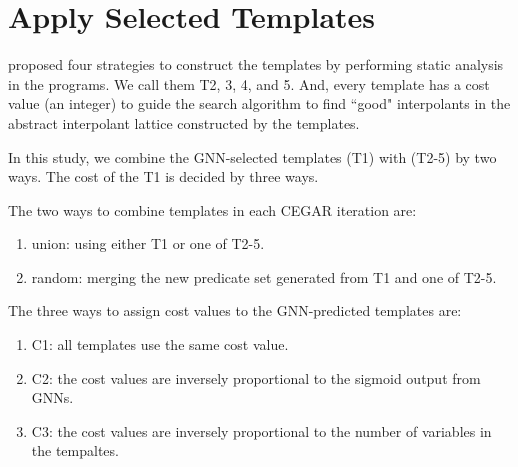 

\section{Apply Selected Templates}\label{section:apply-selected-templates}

\cite{Leroux2016} proposed four strategies to construct the templates by performing static analysis in the programs. We call them T2, 3, 4, and 5.
%
And, every template has a cost value (an integer) to guide the search algorithm to find ``good" interpolants in the abstract interpolant lattice constructed by the templates.


In this study, we combine the GNN-selected templates (T1) with (T2-5) by two ways. The cost of the T1 is decided by three ways.


The two ways to combine templates in each CEGAR iteration are:
\begin{enumerate}
  \item union: using either T1 or one of T2-5.
  \item random: merging the new predicate set generated from T1 and one of T2-5. 
\end{enumerate}


The three ways to assign cost values to the GNN-predicted templates are:
\begin{enumerate}
  \item C1: all templates use the same cost value.
  \item C2: the cost values are inversely proportional to the sigmoid output from GNNs. 
  \item C3: the cost values are inversely proportional to the number of variables in the tempaltes.
\end{enumerate}









